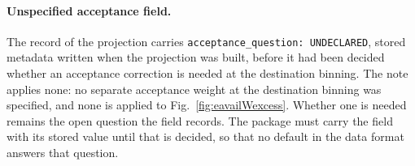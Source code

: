 \paragraph{Unspecified acceptance field.} The record of the projection carries \texttt{acceptance\_question: UNDECLARED}, stored metadata written when the projection was built, before it had been decided whether an acceptance correction is needed at the destination binning. The note applies none: no separate acceptance weight at the destination binning was specified, and none is applied to Fig.~\ref{fig:eavailWexcess}. Whether one is needed remains the open question the field records. The package must carry the field with its stored value until that is decided, so that no default in the data format answers that question.
